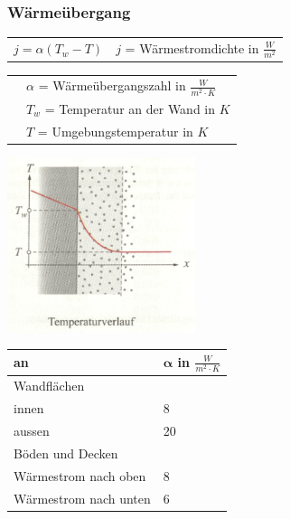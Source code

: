 		\newline
		\newline
		\begin{minipage}[t]{11.5cm}
			\subsubsection{Wärmeübergang}
				\renewcommand{\arraystretch}{2.5}
				\begin{tabular}{ p{4cm} | p{7cm}}
					$j = \alpha(T_w -T)$	&	$j$ = Wärmestromdichte in $\frac{W}{m^2}$\\
				\end{tabular}
				\renewcommand{\arraystretch}{1.5}
				\begin{tabular}{ p{4cm} | p{7cm} }
					& $\alpha$ = Wärmeübergangszahl in $\frac{W}{m^2 \cdot K}$\\
					& $T_w$ = Temperatur an der Wand in $K$\\
					& $T$ = Umgebungstemperatur in $K$\\
				\end{tabular} 
				\renewcommand{\arraystretch}{1}
		\end{minipage}
		\begin{minipage}[t]{10cm}
			\vspace{-\ht\strutbox}\includegraphics[width=5.5cm]{./bilder/Waermeuebergang.png}
		\end{minipage}
		\newline
		\newline
		\newline
		\newline
		\begin{minipage}{12cm}
			\newline
			\renewcommand{\arraystretch}{1.5}
			\begin{tabular}{ | p{5cm} | p{3cm} |}
				\hline
				\textbf{an} & $\boldsymbol{\alpha}$ in $\frac{W}{m^2 \cdot K}$\\
				\hline
				Wandflächen & \\
				\quad innen & 8\\
				\quad aussen & 20\\
				\hline
				Böden und Decken & \\
				\quad Wärmestrom nach oben & 8\\
				\quad Wärmestrom nach unten & 6\\
				\hline
			\end{tabular}
			\renewcommand{\arraystretch}{1}
		\end{minipage}
		\vspace{3cm}
		\newline

